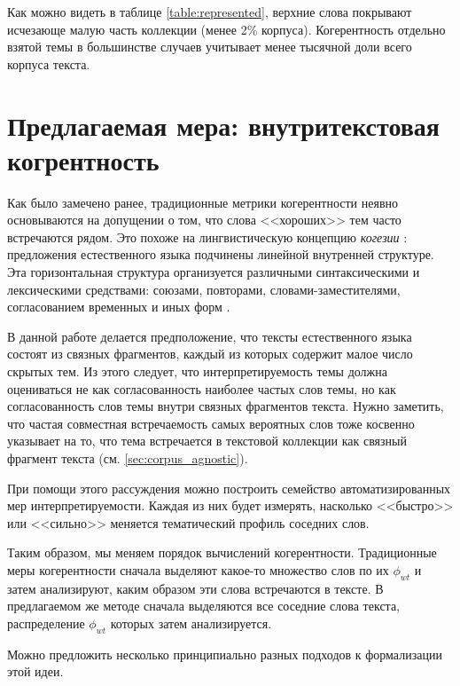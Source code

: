 Как можно видеть в таблице \ref{table:represented}, верхние слова покрывают исчезающе малую часть коллекции (менее 2\% корпуса). Когерентность отдельно взятой темы в большинстве случаев учитывает менее тысячной доли всего корпуса текста.

\section{Предлагаемая мера: внутритекстовая когрентность}

Как было замечено ранее, традиционные метрики когерентности неявно основываются на допущении о том, что слова <<хороших>> тем часто встречаются рядом. Это похоже на лингвистическую концепцию \textit{когезии} \cite{halliday1976cohesion}: предложения естественного языка подчинены линейной внутренней структуре. Эта горизонтальная структура организуется
различными синтаксическими и лексическими средствами: союзами, повторами, словами-заместителями, согласованием временных и иных форм \cite{kazachenko2009}.

В данной работе делается предположение, что тексты естественного языка состоят из связных фрагментов, каждый из которых содержит малое число скрытых тем. Из этого следует, что интерпретируемость темы должна оцениваться не как согласованность наиболее частых слов темы, но как согласованность слов темы внутри связных фрагментов текста. Нужно заметить, что частая совместная встречаемость самых вероятных слов тоже косвенно указывает на то, что тема встречается в текстовой коллекции как связный фрагмент текста (см. \ref{sec:corpus_agnostic}).

При помощи этого рассуждения можно построить семейство автоматизированных мер интерпретируемости. Каждая из них будет измерять, насколько <<быстро>> или <<сильно>> меняется тематический профиль соседних слов.

Таким образом, мы меняем порядок вычислений когерентности. Традиционные меры когерентности сначала выделяют какое-то множество слов по их $\phi_{wt}$ и затем анализируют, каким образом эти слова встречаются в тексте. В предлагаемом же методе сначала выделяются все соседние слова текста, распределение $\phi_{wt}$ которых затем анализируется.

Можно предложить несколько принципиально разных подходов к формализации этой идеи.

